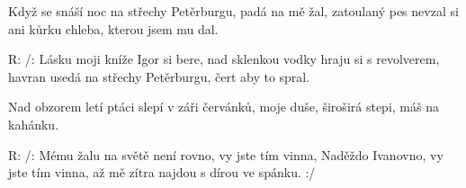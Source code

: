 \resetVars
{}
\MakeHeader
\Lyrics

Když se snáší noc na střechy Petěrburgu, padá na mě žal,
zatoulaný pes nevzal si ani kůrku chleba, kterou jsem mu dal.

R: /: Lásku moji kníže Igor si bere,
nad sklenkou vodky hraju si s revolverem,
havran usedá na střechy Petěrburgu, čert aby to spral.

Nad obzorem letí ptáci slepí v záři červánků,
moje duše, široširá stepi, máš na kahánku.

R: /: Mému žalu na světě není rovno, vy jste tím vinna, Naděždo Ivanovno,
vy jste tím vinna, až mě zítra najdou s dírou ve spánku. :/

\Next
